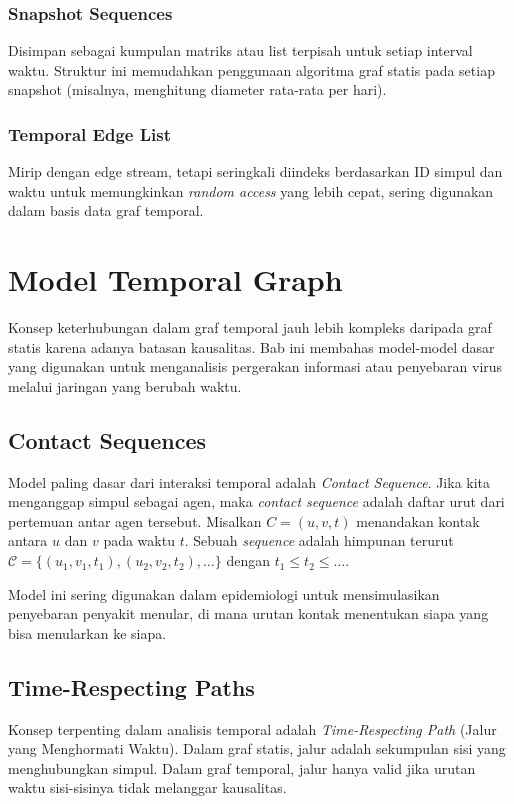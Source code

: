 \documentclass[12pt,a4paper]{book}
\begin{document}
\subsection{Snapshot Sequences}
Disimpan sebagai kumpulan matriks atau list terpisah untuk setiap interval waktu. Struktur ini memudahkan penggunaan algoritma graf statis pada setiap snapshot (misalnya, menghitung diameter rata-rata per hari).

\subsection{Temporal Edge List}
Mirip dengan edge stream, tetapi seringkali diindeks berdasarkan ID simpul dan waktu untuk memungkinkan \textit{random access} yang lebih cepat, sering digunakan dalam basis data graf temporal.

\chapter{Model Temporal Graph}
Konsep keterhubungan dalam graf temporal jauh lebih kompleks daripada graf statis karena adanya batasan kausalitas. Bab ini membahas model-model dasar yang digunakan untuk menganalisis pergerakan informasi atau penyebaran virus melalui jaringan yang berubah waktu.

\section{Contact Sequences}
Model paling dasar dari interaksi temporal adalah \textit{Contact Sequence}. Jika kita menganggap simpul sebagai agen, maka \textit{contact sequence} adalah daftar urut dari pertemuan antar agen tersebut.
Misalkan $C = (u, v, t)$ menandakan kontak antara $u$ dan $v$ pada waktu $t$. Sebuah \textit{sequence} adalah himpunan terurut $\mathcal{C} = \{ (u_1, v_1, t_1), (u_2, v_2, t_2), \dots \}$ dengan $t_1 \le t_2 \le \dots$.

Model ini sering digunakan dalam epidemiologi untuk mensimulasikan penyebaran penyakit menular, di mana urutan kontak menentukan siapa yang bisa menularkan ke siapa.

\section{Time-Respecting Paths}
Konsep terpenting dalam analisis temporal adalah \textit{Time-Respecting Path} (Jalur yang Menghormati Waktu).
Dalam graf statis, jalur adalah sekumpulan sisi yang menghubungkan simpul. Dalam graf temporal, jalur hanya valid jika urutan waktu sisi-sisinya tidak melanggar kausalitas.
\end{document}
